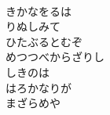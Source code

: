\documentclass[10pt,b5j]{tarticle} %
\begin{document}
\begin{enumerate}
\begin{minipage}[c]{\blocksize}
        \vspace{\linespace}
        \item~\\
        きかなをるは\\
        りぬしみて\\
        ひたぶるとむぞ\\
        めつつべからざりし\\
        しきのは\\
        はろかなりが\\
        まざらめや
    
    \end{minipage}
\end{enumerate} %
\end{document}
